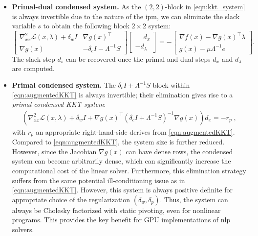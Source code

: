 \documentclass{article}
\begin{document}
\begin{itemize}[leftmargin=*,itemsep=0pt,parsep=0pt,partopsep=0pt]
\item \textbf{Primal-dual condensed system.}
As the $(2,2)$-block in \cref{eqn:kkt_system} is always invertible due to the nature of the \gls*{ipm}, we can eliminate the slack variable $s$ to obtain the following block $2\times 2$ system:
\begin{equation}\label{eqn:augmentedKKT}
  \begin{bmatrix}
    \nabla^2_{x x} \mathcal{L}(x,\lambda) + \delta_w I & \nabla g(x)^\top \\
    \nabla g(x) &  - \delta_c I - \Lambda^{-1} S
  \end{bmatrix}
  \begin{bmatrix}
    \phantom{-}d_x\\
    - d_\lambda
  \end{bmatrix} =
  -\begin{bmatrix}
    \nabla f(x) - \nabla g(x)^\top \lambda\\
    g(x) - \mu \Lambda^{-1} e
  \end{bmatrix}.
\end{equation}
The slack step $d_s$ can be recovered once the primal and dual steps $d_x$ and $d_\lambda$ are computed.

\item \textbf{Primal condensed system.}
The $ \delta_c I+ \Lambda^{-1}S $ block within \eqref{eqn:augmentedKKT} is always invertible; their elimination gives rise to a \emph{primal condensed KKT system}:
\begin{align}\label{eqn:kkt_primal}
  \left(\nabla^2_{x x} \mathcal{L}(x, \lambda) + \delta_w I + \nabla g(x)^\top (\delta_c I + \Lambda^{-1} S)^{-1} \nabla g(x)  \right) d_x = - r_p \; ,
\end{align}
with $r_p$ an appropriate right-hand-side derives from \eqref{eqn:augmentedKKT}.
Compared to \cref{eqn:augmentedKKT}, the system size is further reduced.
However, since the Jacobian $\nabla g(x)$ can have dense rows, the condensed system can become arbitrarily dense, which can significantly increase the computational cost of the linear solver. Furthermore, this elimination strategy suffers from the same potential ill-conditioning issue as in \cref{eqn:augmentedKKT}.
However, this system is always positive definite for appropriate choice of the
regularization $(\delta_w, \delta_p)$.
Thus, the system can always be Cholesky factorized with static pivoting, even for nonlinear programs.
This provides the key benefit for GPU implementations of \gls*{nlp} solvers.


\end{itemize}
\end{document}
